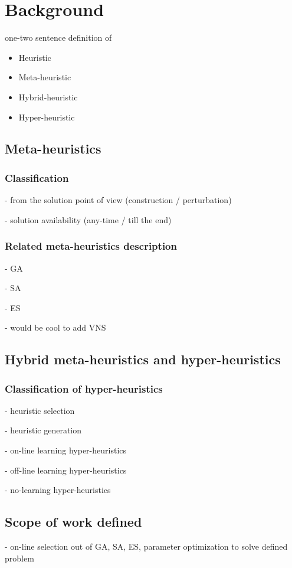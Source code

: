 \chapter{Background}\label{bg}
one-two sentence definition of 
\begin{itemize}
  \item Heuristic
  \item Meta-heuristic
  \item Hybrid-heuristic
  \item Hyper-heuristic
\end{itemize}

\section{Meta-heuristics}
\subsection{Classification}

- from the solution point of view (construction / perturbation)

- solution availability (any-time / till the end)
     
\subsection{Related meta-heuristics description}
- GA

- SA

- ES

- would be cool to add VNS
  
\section{Hybrid meta-heuristics and hyper-heuristics}
\subsection{Classification of hyper-heuristics}
- heuristic selection

- heuristic generation

- on-line learning hyper-heuristics

- off-line learning hyper-heuristics

- no-learning hyper-heuristics


\section{Scope of work defined}
- on-line selection out of GA, SA, ES, parameter optimization to solve defined problem

